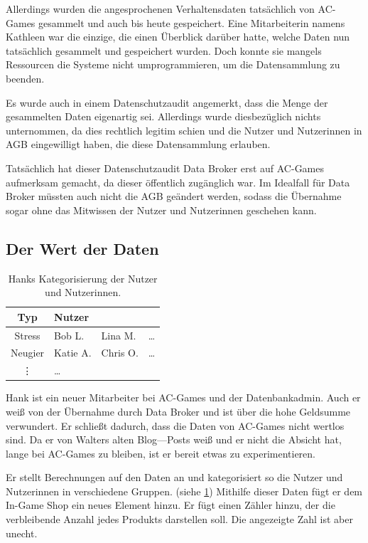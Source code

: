 \documentclass[11pt, a4paper]{scrartcl}
\begin{document}
Allerdings wurden die angesprochenen Verhaltensdaten tatsächlich von AC-Games gesammelt und auch bis heute gespeichert.
Eine Mitarbeiterin namens Kathleen war die einzige, die einen Überblick darüber hatte, welche Daten nun tatsächlich gesammelt und gespeichert wurden.
Doch konnte sie mangels Ressourcen die Systeme nicht umprogrammieren, um die Datensammlung zu beenden.

Es wurde auch in einem Datenschutzaudit angemerkt, dass die Menge der gesammelten Daten eigenartig sei.
Allerdings wurde diesbezüglich nichts unternommen, da dies rechtlich legitim schien
und die Nutzer und Nutzerinnen in AGB eingewilligt haben, die diese Datensammlung erlauben.

Tatsächlich hat dieser Datenschutzaudit Data Broker erst auf AC-Games aufmerksam gemacht, da dieser öffentlich zugänglich war.
Im Idealfall für Data Broker müssten auch nicht die AGB geändert werden, 
sodass die Übernahme sogar ohne das Mitwissen der Nutzer und Nutzerinnen geschehen kann. 

\subsection{Der Wert der Daten}

\begin{table}
   \begin{tabular}{c|lll} 
        \textbf{Typ} & \textbf{Nutzer} \\\hline
        Stress & Bob L. & Lina M. & \dots \\\hline
        Neugier & Katie A. & Chris O. & \dots \\ \vdots & \dots & & 
    \end{tabular} 
    \caption{Hanks Kategorisierung der Nutzer und Nutzerinnen.}
    \label{tab:03:categories}
\end{table}

Hank ist ein neuer Mitarbeiter bei AC-Games und der Datenbankadmin.
Auch er weiß von der Übernahme durch Data Broker und ist über die hohe Geldsumme verwundert.
Er schließt dadurch, dass die Daten von AC-Games nicht wertlos sind.
Da er von Walters alten Blog—Posts weiß und er nicht die Absicht hat, lange bei AC-Games zu bleiben,
ist er bereit etwas zu experimentieren.

Er stellt Berechnungen auf den Daten an und kategorisiert so die Nutzer und Nutzerinnen in verschiedene Gruppen. (siehe \cref{tab:03:categories})
Mithilfe dieser Daten fügt er dem In-Game Shop ein neues Element hinzu.
Er fügt einen Zähler hinzu, der die verbleibende Anzahl jedes Produkts darstellen soll.
Die angezeigte Zahl ist aber unecht.
\end{document}
